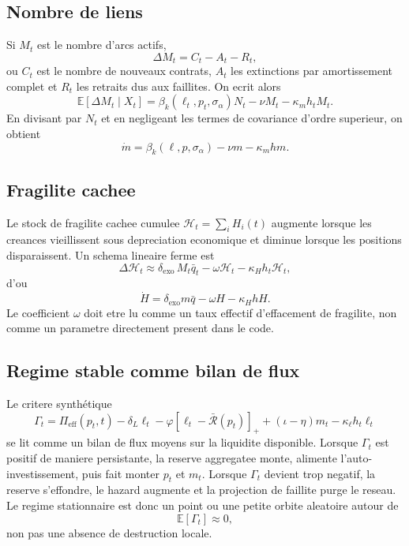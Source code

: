 \documentclass[11pt,a4paper]{article}
\begin{document}
\subsection{Nombre de liens}
Si $M_t$ est le nombre d'arcs actifs,
\[
\Delta M_t = C_t - A_t - R_t,
\]
ou $C_t$ est le nombre de nouveaux contrats, $A_t$ les extinctions par amortissement complet et $R_t$ les retraits dus aux faillites. On ecrit alors
\[
\mathbb E[\Delta M_t\mid X_t]
=
\beta_k(\ell_t,p_t,\sigma_\alpha)N_t
-\nu M_t
-\kappa_m h_t M_t.
\]
En divisant par $N_t$ et en negligeant les termes de covariance d'ordre superieur, on obtient
\[
\dot m
=
\beta_k(\ell,p,\sigma_\alpha)
-\nu m
-\kappa_m hm.
\]

\subsection{Fragilite cachee}
Le stock de fragilite cachee cumulee $\mathcal H_t=\sum_i H_i(t)$ augmente lorsque les creances vieillissent sous depreciation economique et diminue lorsque les positions disparaissent. Un schema lineaire ferme est
\[
\Delta \mathcal H_t
\approx
\delta_{\mathrm{exo}}\,M_t\bar q_t
-\omega \mathcal H_t
-\kappa_H h_t \mathcal H_t,
\]
d'ou
\[
\dot H
=
\delta_{\mathrm{exo}}m\bar q
-\omega H
-\kappa_H hH.
\]
Le coefficient $\omega$ doit etre lu comme un taux effectif d'effacement de fragilite, non comme un parametre directement present dans le code.

\subsection{Regime stable comme bilan de flux}
Le critere synthétique
\[
\Gamma_t =
\Pi_{\mathrm{eff}}(p_t,t)
-\delta_L\ell_t
-\varphi[\ell_t-\bar{\mathcal R}(p_t)]_+
+(\iota-\eta)m_t
-\kappa_\ell h_t\ell_t
\]
se lit comme un bilan de flux moyens sur la liquidite disponible. Lorsque $\Gamma_t$ est positif de maniere persistante, la reserve aggregatee monte, alimente l'auto-investissement, puis fait monter $p_t$ et $m_t$. Lorsque $\Gamma_t$ devient trop negatif, la reserve s'effondre, le hazard augmente et la projection de faillite purge le reseau. Le regime stationnaire est donc un point ou une petite orbite aleatoire autour de
\[
\mathbb E[\Gamma_t]\approx 0,
\]
non pas une absence de destruction locale.
\end{document}
